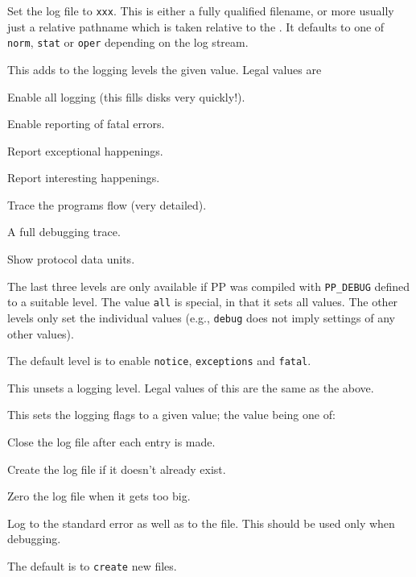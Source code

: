 \begin{describe}
\item[\verb+file=xxx+:]
Set the log file to \verb+xxx+. This is either a fully qualified
filename, or more usually just a relative pathname which is taken
relative to the . It defaults to one of \verb|norm|,
\verb|stat| or \verb|oper| depending on the log stream.

\item[\verb+level=value+:]
This adds to the logging levels the given value. Legal values are
\begin{describe}
\item[\verb+all+:]	Enable all logging (this fills disks very quickly!).
\item[\verb+fatal+:]	Enable reporting of fatal errors.
\item[\verb+exceptions+:] Report exceptional happenings.
\item[\verb+notice+:]	Report interesting happenings.
\item[\verb+trace+:]	Trace the programs flow (very detailed).
\item[\verb+debug+:]	A full debugging trace.
\item[\verb+pdus+:]	Show protocol data units.
\end{describe}
The last three levels are only available if PP was compiled with
\verb+PP_DEBUG+ defined to a suitable level. The value \verb|all| is
special, in that it sets all values. The other levels only set the
individual values (e.g., \verb+debug+ does not imply settings of any
other values).

The default level is to enable \verb+notice+, \verb+exceptions+ and
\verb+fatal+.

\item[\verb+dlevel=value+:]
This unsets a logging level. Legal values of this are the same as
the above.

\item[\verb+sflags=value+:]
This sets the logging flags to a given value; the value being one of:
\begin{describe}
\item[\verb+close+:]	Close the log file after each entry is made.
\item[\verb+create+:]	Create the log file if it doesn't already exist.
\item[\verb+zero+:]	Zero the log file when it gets too big.
\item[\verb+tty+:]	Log to the standard error as well as to the
file. This should be used only when debugging.
\end{describe}
The default is to \verb|create| new files.


\end{describe}
